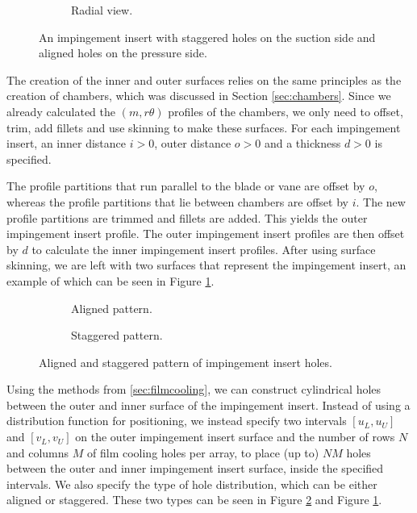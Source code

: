 \documentclass[a4paper, 11pt]{report}
\theoremstyle{definition}
\begin{document}
\begin{figure}[H]
\begin{subfigure}{.5\textwidth}
			\caption{Radial view.}
		\end{subfigure}
		\caption{An impingement insert with staggered holes on the suction side and aligned holes on the pressure side.}
		\label{fig:impingementinsert}
	\end{figure}

	The creation of the inner and outer surfaces relies on the same principles as the creation of chambers, which was discussed in Section \ref{sec:chambers}. Since we already calculated the $(m, r\theta)$ profiles of the chambers, we only need to offset, trim, add fillets and use skinning to make these surfaces. For each impingement insert, an inner distance $i > 0$, outer distance $o > 0$ and a thickness $d > 0$ is specified.

	The profile partitions that run parallel to the blade or vane are offset by $o$, whereas the profile partitions that lie between chambers are offset by $i$. The new profile partitions are trimmed and fillets are added. This yields the outer impingement insert profile. The outer impingement insert profiles are then offset by $d$ to calculate the inner impingement insert profiles. After using surface skinning, we are left with two surfaces that represent the impingement insert, an example of which can be seen in Figure \ref{fig:impingementinsert}.
	
	\begin{figure}[H]
		\centering
		\begin{subfigure}{.25\textwidth}
			
			\caption{Aligned pattern.}
		\end{subfigure}
		\phantom{aaaaaaaaaaa}
		\begin{subfigure}{.25\textwidth}
			
			\caption{Staggered pattern.}
		\end{subfigure}
		\caption{Aligned and staggered pattern of impingement insert holes.}
		\label{fig:alignedstaggered}
	\end{figure}

	Using the methods from \ref{sec:filmcooling}, we can construct cylindrical holes between the outer and inner surface of the impingement insert. Instead of using a distribution function for positioning, we instead specify two intervals $[u_L, u_U]$ and $[v_L, v_U]$ on the outer impingement insert surface and the number of rows $N$ and columns $M$ of film cooling holes per array, to place (up to) $NM$ holes between the outer and inner impingement insert surface, inside the specified intervals. We also specify the type of hole distribution, which can be either aligned or staggered. These two types can be seen in Figure \ref{fig:alignedstaggered} and Figure \ref{fig:impingementinsert}.
\end{document}
